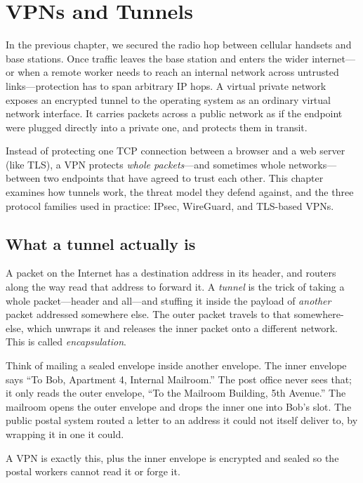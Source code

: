 \chapter{VPNs and Tunnels}

In the previous chapter, we secured the radio hop between cellular handsets and base stations. Once traffic leaves the base station and enters the wider internet---or when a remote worker needs to reach an internal network across untrusted links---protection has to span arbitrary IP hops. A virtual private network exposes an encrypted tunnel to the operating system as an ordinary virtual network interface. It carries packets across a public network as if the endpoint were plugged directly into a private one, and protects them in transit.

Instead of protecting one TCP connection between a browser and a web server (like TLS), a VPN protects \emph{whole packets}---and sometimes whole networks---between two endpoints that have agreed to trust each other. This chapter examines how tunnels work, the threat model they defend against, and the three protocol families used in practice: IPsec, WireGuard, and TLS-based VPNs.


\chapterline

\section{What a tunnel actually is}
\label{ch30:tunnel}

A packet on the Internet has a destination address in its header, and routers along the way read that address to forward it. A \emph{tunnel} is the trick of taking a whole packet---header and all---and stuffing it inside the payload of \emph{another} packet addressed somewhere else. The outer packet travels to that somewhere-else, which unwraps it and releases the inner packet onto a different network. This is called \emph{encapsulation}.

\begin{intuitionbox}
Think of mailing a sealed envelope inside another envelope. The inner envelope says ``To Bob, Apartment 4, Internal Mailroom.'' The post office never sees that; it only reads the outer envelope, ``To the Mailroom Building, 5th Avenue.'' The mailroom opens the outer envelope and drops the inner one into Bob's slot. The public postal system routed a letter to an address it could not itself deliver to, by wrapping it in one it could.

A VPN is exactly this, plus the inner envelope is encrypted and sealed so the postal workers cannot read it or forge it.
\end{intuitionbox}

